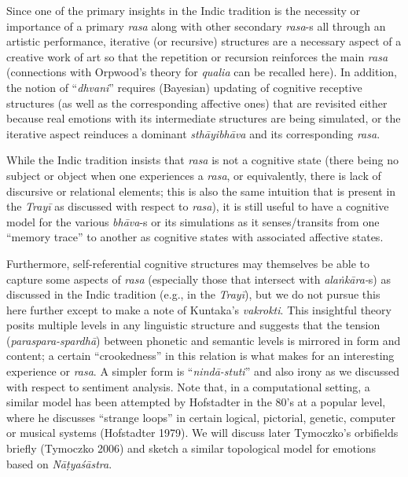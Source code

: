 Since one of the primary insights in the Indic tradition is the necessity or importance of a primary \textsl{rasa} along with other secondary \textsl{rasa}-s all through an artistic performance, iterative (or recursive) structures are a necessary aspect of a creative work of art so that the repetition or recursion reinforces the main \textsl{rasa} (connections with Orpwood’s theory for \textsl{qualia} can be recalled here). In addition, the notion of “\textsl{dhvani}” requires (Bayesian) updating of cognitive receptive structures (as well as the corresponding affective ones) that are revisited either because real emotions with its intermediate structures are being simulated, or the iterative aspect reinduces a dominant \textsl{sthāyibhāva} and its corresponding \textsl{rasa}.

While the Indic tradition insists that \textsl{rasa} is not a cognitive state (there being no subject or object when one experiences a \textsl{rasa}, or equivalently, there is lack of discursive or relational elements; this is also the same intuition that is present in the \textsl{Trayī} as discussed with respect to \textsl{rasa}), it is still useful to have a cognitive model for the various \textsl{bhāva}-s or its simulations as it senses/transits from one “memory trace” to another as cognitive states with associated affective states.

Furthermore, self-referential cognitive structures may themselves be able to capture some aspects of \textsl{rasa} (especially those that intersect with \textsl{alaṅkāra-}s) as discussed in the Indic tradition (e.g., in the \textsl{Trayī}), but we do not pursue this here further except to make a note of Kuntaka's \textsl{vakrokti}. This insightful theory posits multiple levels in any linguistic structure and suggests that the tension (\textsl{paraspara-spardhā}) between phonetic and semantic levels is mirrored in form and content; a certain “crookedness” in this relation is what makes for an interesting experience or \textsl{rasa}. A simpler form is “\textsl{nindā-stuti}” and also irony as we discussed with respect to sentiment analysis. Note that, in a computational setting, a similar model has been attempted by Hofstadter in the 80's at a popular level, where he discusses “strange loops” in certain logical, pictorial, genetic, computer or musical systems (Hofstadter 1979). We will discuss later Tymoczko’s orbifields briefly (Tymoczko 2006) and sketch a similar topological model for emotions based on \textsl{Nāṭyaśāstra}.

